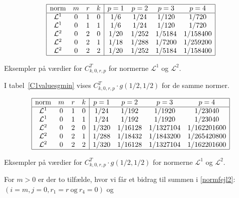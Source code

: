 \begin{table}[htb]
\begin{displaymath}
\begin{array}{|cccc|cccc|}
  \hline {\rm{norm}} & m & r & k & p=1 & p=2 & p=3 & p=4 \\
  \hline {\mathcal L}^1 & 0 & 1 & 0 & 1/6 & 1/24 & 1/120 &
         1/720 \\
         {\mathcal L}^1 & 0 & 1 & 1 & 1/6 & 1/24 & 1/120 &
         1/720 \\
         {\mathcal L}^2 & 0 & 2 & 0 & 1/20 & 1/252 &
         1/5184 & 1/158400 \\
         {\mathcal L}^2 & 0 & 2 & 1 & 1/18 & 1/288 &
         1/7200 & 1/259200 \\
         {\mathcal L}^2 & 0 & 2 & 2 & 1/20 & 1/252 &
         1/5184 & 1/158400 \\
  \hline
\end{array}
\end{displaymath}
\caption{Eksempler på værdier for $C^T_{k,0,r,p}$ for normerne
${\mathcal L}^1$ og ${\mathcal L}^2$.\label{C1values}}
\end{table}
I tabel~\ref{C1valuesgmin} vises $C^T_{k,0,r,p}\cdot g(1/2,1/2)$ for
de samme normer.
\begin{table}[htb]
\begin{displaymath}
\begin{array}{|cccc|cccc|}
  \hline {\rm{norm}} & m & r & k & p=1 & p=2 & p=3 & p=4 \\
  \hline {\mathcal L}^1 & 0 & 1 & 0 & 1/24 & 1/192 & 1/1920 &
         1/23040 \\
         {\mathcal L}^1 & 0 & 1 & 1 & 1/24 & 1/192 & 1/1920 &
         1/23040 \\
         {\mathcal L}^2 & 0 & 2 & 0 & 1/320 & 1/16128 &
         1/1327104 & 1/162201600 \\
         {\mathcal L}^2 & 0 & 2 & 1 & 1/288 & 1/18432 &
         1/1843200 & 1/265420800 \\
         {\mathcal L}^2 & 0 & 2 & 2 & 1/320 & 1/16128 &
         1/1327104 & 1/162201600 \\
  \hline
\end{array}
\end{displaymath}
\caption{Eksempler på værdier for $C^T_{k,0,r,p}\cdot g(1/2,1/2)$ for normerne
${\mathcal L}^1$ og ${\mathcal L}^2$.\label{C1valuesgmin}}
\end{table}
For $m>0$ er der to tilfælde, hvor vi får et bidrag til summen i
\eqref{normfejl2}: $(i=m,j=0,r_1=r\ \text{og}\ r_4=0)$ og

